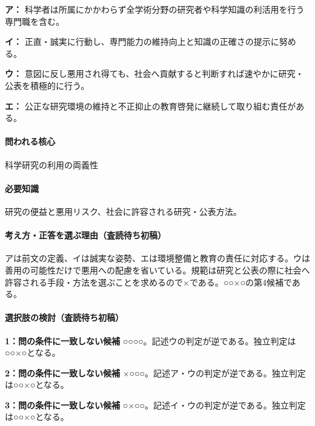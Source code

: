 \noindent\textbf{ア：} 科学者は所属にかかわらず全学術分野の研究者や科学知識の利活用を行う専門職を含む。\par

\noindent\textbf{イ：} 正直・誠実に行動し、専門能力の維持向上と知識の正確さの提示に努める。\par

\noindent\textbf{ウ：} 意図に反し悪用され得ても、社会へ貢献すると判断すれば速やかに研究・公表を積極的に行う。\par

\noindent\textbf{エ：} 公正な研究環境の維持と不正抑止の教育啓発に継続して取り組む責任がある。\par

\paragraph{問われる核心} 科学研究の利用の両義性

\paragraph{必要知識} 研究の便益と悪用リスク、社会に許容される研究・公表方法。

\paragraph{考え方・正答を選ぶ理由（査読待ち初稿）} アは前文の定義、イは誠実な姿勢、エは環境整備と教育の責任に対応する。ウは善用の可能性だけで悪用への配慮を省いている。規範は研究と公表の際に社会へ許容される手段・方法を選ぶことを求めるので×である。○○×○の第4候補である。

\paragraph{選択肢の検討（査読待ち初稿）}\mbox{}\par

\noindent\textbf{1：問の条件に一致しない候補} ○○○○。記述ウの判定が逆である。独立判定は○○×○となる。\par

\noindent\textbf{2：問の条件に一致しない候補} ×○○○。記述ア・ウの判定が逆である。独立判定は○○×○となる。\par

\noindent\textbf{3：問の条件に一致しない候補} ○×○○。記述イ・ウの判定が逆である。独立判定は○○×○となる。\par

